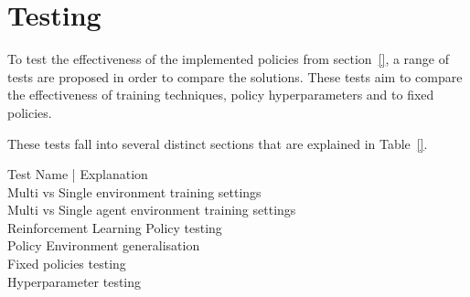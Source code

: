 \chapter{Testing}\label{ch:testing-of-the-implementation}
To test the effectiveness of the implemented policies from section~\ref{}, a range of tests are proposed in order to
compare the solutions. These tests aim to compare the effectiveness of training techniques, policy hyperparameters and
to fixed policies.

These tests fall into several distinct sections that are explained in Table~\ref{}.
\begin{tabular}
 \begin{table}
  Test Name | Explanation \\
  Multi vs Single environment training settings \\
  Multi vs Single agent environment training settings \\
  Reinforcement Learning Policy testing \\
  Policy Environment generalisation \\
  Fixed policies testing \\
  Hyperparameter testing \\
  \end{table}
 \end{tabular}
